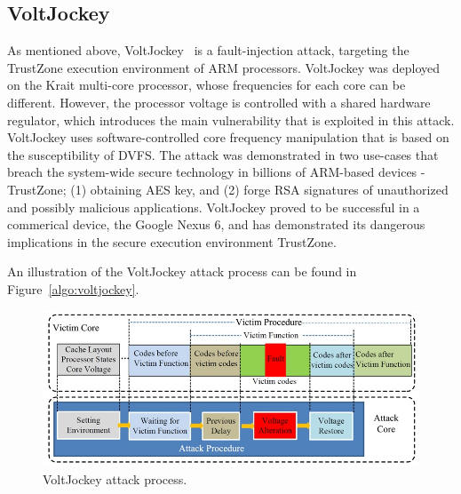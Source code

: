 \subsection{VoltJockey}
As mentioned above, VoltJockey~\cite{qiu2019voltjockey} is a fault-injection attack, targeting the TrustZone execution environment of ARM processors.
VoltJockey was deployed on the Krait multi-core processor, whose frequencies for each core can be different.
However, the processor voltage is controlled with a shared hardware regulator, which introduces the main vulnerability that is exploited in this attack.
VoltJockey uses software-controlled core frequency manipulation that is based on the susceptibility of DVFS.
The attack was demonstrated in two use-cases that breach the system-wide secure technology in billions of ARM-based devices - TrustZone; (1) obtaining AES key, and (2) forge RSA signatures of unauthorized and possibly malicious applications.
VoltJockey proved to be successful in a commerical device, the Google Nexus 6, and has demonstrated its dangerous implications in the secure execution environment TrustZone.

An illustration of the VoltJockey attack process can be found in Figure~\ref{algo:voltjockey}.

\begin{figure}[!ht]
	\centering
	\includegraphics[width=0.7\linewidth]{images/chapter8/voltjockey_process.jpg}
	\caption{VoltJockey attack process.}
	\label{fig:voltjockey}
\end{figure}